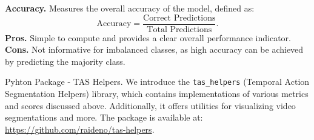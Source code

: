 \noindent\textbf{Accuracy.} Measures the overall accuracy of the model, defined as:
$$
\text{Accuracy} = \frac{\text{Correct Predictions}}{\text{Total Predictions}}.
$$
\noindent\textbf{\small{Pros.}} Simple to compute and provides a clear overall performance indicator. \textbf{\small{Cons.}} Not informative for imbalanced classes, as high accuracy can be achieved by predicting the majority class.

\begin{AIbox}{Pyhton Package - TAS Helpers.}
    We introduce the \texttt{tas\_helpers} (Temporal Action Segmentation Helpers) library, which contains implementations of various metrics and scores discussed above. Additionally, it offers utilities for visualizing video segmentations and more. The package is available at: \url{https://github.com/raideno/tas-helpers}.
\end{AIbox}
